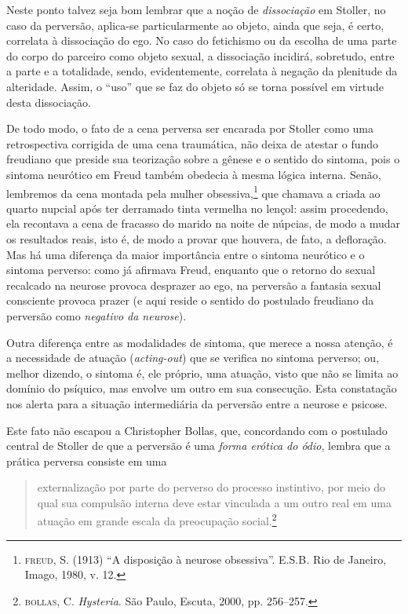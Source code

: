 Neste ponto talvez seja bom lembrar que a noção de \emph{dissociação} em
Stoller, no caso da perversão, aplica-se particularmente ao objeto,
ainda que seja, é certo, correlata à dissociação do ego. No caso do
fetichismo ou da escolha de uma parte do corpo do parceiro como objeto
sexual, a dissociação incidirá, sobretudo, entre a parte e a totalidade,
sendo, evidentemente, correlata à negação da plenitude da alteridade.
Assim, o ``uso'' que se faz do objeto só se torna possível em virtude
desta dissociação.

De todo modo, o fato de a cena perversa ser encarada por Stoller como
uma retrospectiva corrigida de uma cena traumática, não deixa de atestar
o fundo freudiano que preside sua teorização sobre a gênese e o sentido
do sintoma, pois o sintoma neurótico em Freud também obedecia à mesma
lógica interna. Senão, lembremos da cena montada pela mulher
obsessiva,\footnote{\textsc{freud}, S. (1913) ``A disposição à neurose
  obsessiva''. E.S.B\emph{.} Rio de Janeiro, Imago, 1980, v. 12.} que
chamava a criada ao quarto nupcial após ter derramado tinta vermelha no
lençol: assim procedendo, ela recontava a cena de fracasso do marido na
noite de núpcias, de modo a mudar os resultados reais, isto é, de modo a
provar que houvera, de fato, a defloração. Mas há uma diferença da maior
importância entre o sintoma neurótico e o sintoma perverso: como já
afirmava Freud, enquanto que o retorno do sexual recalcado na neurose
provoca desprazer ao ego, na perversão a fantasia sexual consciente
provoca prazer (e aqui reside o sentido do postulado freudiano da
perversão como \emph{negativo da neurose}).

Outra diferença entre as modalidades de sintoma, que merece a nossa
atenção, é a necessidade de atuação (\emph{acting-out}) que se verifica
no sintoma perverso; ou, melhor dizendo, o sintoma é, ele próprio, uma
atuação, visto que não se limita ao domínio do psíquico, mas envolve um
outro em sua consecução. Esta constatação nos alerta para a situação
intermediária da perversão entre a neurose e psicose.

Este fato não escapou a Christopher Bollas, que, concordando com o
postulado central de Stoller de que a perversão é uma \emph{forma
erótica do ódio}, lembra que a prática perversa consiste em uma

\begin{quote}
externalização por parte do perverso do processo instintivo, por meio do
qual sua compulsão interna deve estar vinculada a um outro real em uma
atuação em grande escala da preocupação social.\footnote{\textsc{bollas},
  C. \emph{Hysteria}. São Paulo, Escuta, 2000, pp. 256--257.}
\end{quote}

